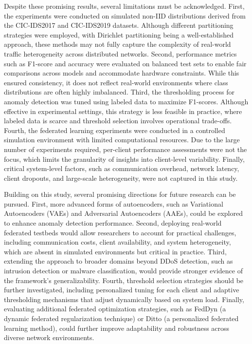 Despite these promising results, several limitations must be acknowledged. First, the experiments were conducted on simulated non-IID distributions derived from the CIC-IDS2017 and CIC-IDS2019 datasets. Although different partitioning strategies were employed, with Dirichlet partitioning being a well-established approach, these methods may not fully capture the complexity of real-world traffic heterogeneity across distributed networks. Second, performance metrics such as F1-score and accuracy were evaluated on balanced test sets to enable fair comparisons across models and accommodate hardware constraints. While this ensured consistency, it does not reflect real-world environments where class distributions are often highly imbalanced. Third, the thresholding process for anomaly detection was tuned using labeled data to maximize F1-scores. Although effective in experimental settings, this strategy is less feasible in practice, where labeled data is scarce and threshold selection involves operational trade-offs. Fourth, the federated learning experiments were conducted in a controlled simulation environment with limited computational resources. Due to the large number of experiments required, per-client performance assessments were not the focus, which limits the granularity of insights into client-level variability. Finally, critical system-level factors, such as communication overhead, network latency, client dropouts, and large-scale heterogeneity, were not captured in this study.

Building on this study, several promising directions for future research can be pursued. First, more advanced forms of autoencoders, such as Variational Autoencoders (VAEs) and Adversarial Autoencoders (AAEs), could be explored to enhance anomaly detection performance. Second, deploying real-world federated testbeds would allow researchers to account for practical challenges, including communication costs, client availability, and system heterogeneity, which are absent in simulated environments but critical in practice. Third, extending the approach to broader domains beyond DDoS detection, such as intrusion detection or malware classification, would provide stronger evidence of the framework’s generalizability. Fourth, threshold selection strategies should be further investigated, including personalized tuning for each client and adaptive thresholding mechanisms that adjust dynamically based on system load. Finally, evaluating additional federated optimization strategies, such as FedDyn (a dynamic federated regularization technique) or Ditto (a personalized federated learning method), could further improve adaptability and robustness across diverse network environments.

